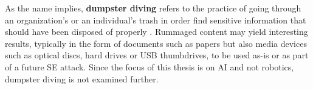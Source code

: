















As the name implies, \textbf{dumpster diving} refers to the practice of going through an organization's or an individual's trash in order find sensitive information that should have been disposed of properly \citep{syafitri_social_2022}. Rummaged content may yield interesting results, typically in the form of documents such as papers but also media devices such as optical discs, hard drives or USB thumbdrives, to be used as-is or as part of a future SE attack. Since the focus of this thesis is on AI and not robotics, dumpster diving is not examined further.











